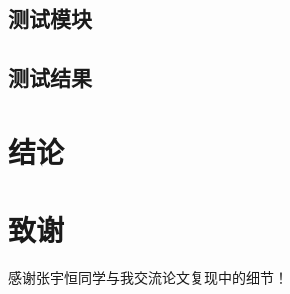 \documentclass[12pt]{article} %
\begin{document}
\begin{sloppypar}
\subsection{测试模块}

\subsection{测试结果}

\newpage
\section{结论}



\newpage
 



\section*{致谢}


感谢张宇恒同学与我交流论文复现中的细节！


\end{sloppypar}
\end{document}
